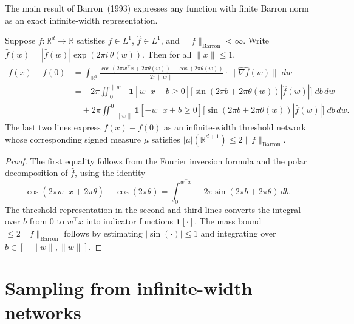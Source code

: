 The main result of Barron~(1993) expresses any function with finite Barron norm as an
exact infinite-width representation.

\begin{theorem}\label{thm:barronRepresentation}
Suppose $f : \mathbb{R}^d \to \mathbb{R}$ satisfies $f \in L^1$, $\widehat{f} \in L^1$,
and $\|f\|_{\mathrm{Barron}} < \infty$.
Write $\widehat{f}(w) = |\widehat{f}(w)| \exp(2\pi i\,\theta(w))$.
Then for all $\|x\| \le 1$,
\begin{align*}
  f(x) - f(0)
  &= \int_{\mathbb{R}^d}
    \frac{\cos(2\pi w^\top x + 2\pi\theta(w)) - \cos(2\pi\theta(w))}{2\pi\|w\|}
    \cdot \bigl\|\widehat{\nabla f}(w)\bigr\|\; dw \\
  &= -2\pi\iint_0^{\|w\|}
    \mathbf{1}[w^\top x - b \ge 0]
    \bigl[\sin(2\pi b + 2\pi\theta(w)) |\widehat{f}(w)|\bigr]\; db\, dw \\
  &\quad + 2\pi\iint_{-\|w\|}^0
    \mathbf{1}[-w^\top x + b \ge 0]
    \bigl[\sin(2\pi b + 2\pi\theta(w)) |\widehat{f}(w)|\bigr]\; db\, dw.
\end{align*}
The last two lines express $f(x) - f(0)$ as an infinite-width threshold network whose
corresponding signed measure $\mu$ satisfies $|\mu|(\mathbb{R}^{d+1}) \le 2\|f\|_{\mathrm{Barron}}$.
\end{theorem}

\begin{proof}
The first equality follows from the Fourier inversion formula and the polar decomposition
of $\widehat{f}$, using the identity
\[
  \cos(2\pi w^\top x + 2\pi\theta) - \cos(2\pi\theta)
  = \int_0^{w^\top x} -2\pi \sin(2\pi b + 2\pi\theta)\, db.
\]
The threshold representation in the second and third lines converts the integral over $b$
from $0$ to $w^\top x$ into indicator functions $\mathbf{1}[\cdot]$.
The mass bound $\le 2\|f\|_{\mathrm{Barron}}$ follows by estimating
$|\sin(\cdot)| \le 1$ and integrating over $b \in [-\|w\|, \|w\|]$.
\end{proof}

\section{Sampling from infinite-width networks}
\label{sec:sampling}

